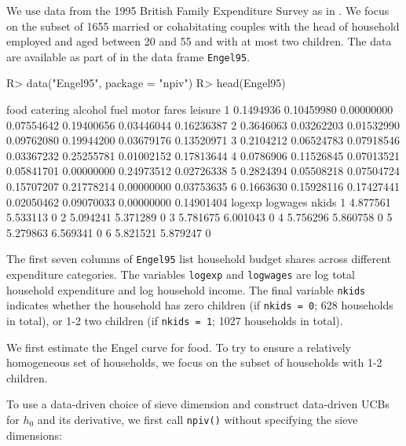 \documentclass[
]{jss}
\begin{document}
We use data from the 1995 British Family Expenditure Survey as in
\citet{BCK}. We focus on the subset of 1655 married or cohabitating
couples with the head of household employed and aged between 20 and 55
and with at most two children. The data are available as part of
 in the data frame \texttt{Engel95}.

\begin{CodeChunk}
\begin{CodeInput}
R> data("Engel95", package = "npiv")
R> head(Engel95)
\end{CodeInput}
\begin{CodeOutput}
       food   catering    alcohol       fuel      motor      fares    leisure
1 0.1494936 0.10459980 0.00000000 0.07554642 0.19400656 0.03446044 0.16236387
2 0.3646063 0.03262203 0.01532990 0.09762080 0.19944200 0.03679176 0.13520971
3 0.2104212 0.06524783 0.07918546 0.03367232 0.25255781 0.01002152 0.17813644
4 0.0786906 0.11526845 0.07013521 0.05841701 0.00000000 0.24973512 0.02726338
5 0.2824394 0.05508218 0.07504724 0.15707207 0.21778214 0.00000000 0.03753635
6 0.1663630 0.15928116 0.17427441 0.02050462 0.09070033 0.00000000 0.14901404
    logexp logwages nkids
1 4.877561 5.533113     0
2 5.094241 5.371289     0
3 5.781675 6.001043     0
4 5.756296 5.860758     0
5 5.279863 6.569341     0
6 5.821521 5.879247     0
\end{CodeOutput}
\end{CodeChunk}

The first seven columns of \texttt{Engel95} list household budget shares
across different expenditure categories. The variables \texttt{logexp}
and \texttt{logwages} are log total household expenditure and log
household income. The final variable \texttt{nkids} indicates whether
the household has zero children (if \texttt{nkids\ =\ 0}; 628 households
in total), or 1-2 two children (if \texttt{nkids\ =\ 1}; 1027 households
in total).

We first estimate the Engel curve for food. To try to ensure a
relatively homogeneous set of households, we focus on the subset of
households with 1-2 children.

\begin{CodeChunk}
\end{CodeChunk}

To use a data-driven choice of sieve dimension and construct data-driven
UCBs for \(h_0\) and its derivative, we first call \texttt{npiv()}
without specifying the sieve dimensions:
\end{document}
